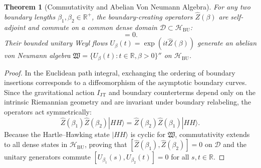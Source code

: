 \documentclass[11pt,a4paper,reqno]{article}
\theoremstyle{plain}
\newtheorem{theorem}{Theorem}[section]
\theoremstyle{definition}
\theoremstyle{remark}
\numberwithin{equation}{section}
\newcommand{\R}{\mathbb{R}}
\newcommand{\Hbu}{\mathcal{H}_{\mathrm{BU}}}
\newcommand{\HH}{|HH\rangle}
\newcommand{\Zop}{\widehat{Z}}
\begin{document}
\begin{theorem}[Commutativity and Abelian Von Neumann Algebra]
\label{thm:abelian_algebra}
For any two boundary lengths $\beta_1, \beta_2 \in \R^+$, the boundary-creating operators $\Zop(\beta)$ are self-adjoint and commute on a common dense domain $\mathcal{D} \subset \Hbu$:
\begin{equation}
  [\Zop(\beta_1), \Zop(\beta_2)] = 0.
\end{equation}
Their bounded unitary Weyl flows $U_\beta(t) = \exp(i t \Zop(\beta))$ generate an abelian von Neumann algebra $\mathfrak{W} = \{U_\beta(t) : t \in \R, \beta > 0\}''$ on $\Hbu$.
\end{theorem}
\begin{proof}
In the Euclidean path integral, exchanging the ordering of boundary insertions corresponds to a diffeomorphism of the asymptotic boundary curves. Since the gravitational action $I_{\mathrm{JT}}$ and boundary counterterms depend only on the intrinsic Riemannian geometry and are invariant under boundary relabeling, the operators act symmetrically:
\begin{equation}
  \Zop(\beta_1) \Zop(\beta_2) \HH = \Zop(\beta_2) \Zop(\beta_1) \HH.
\end{equation}
Because the Hartle--Hawking state $\HH$ is cyclic for $\mathfrak{W}$, commutativity extends to all dense states in $\Hbu$, proving that $[\Zop(\beta_1), \Zop(\beta_2)] = 0$ on $\mathcal{D}$ and the unitary generators commute $[U_{\beta_1}(s), U_{\beta_2}(t)] = 0$ for all $s, t \in \R$.
\end{proof}
\end{document}

